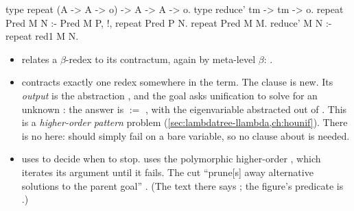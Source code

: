 {{\begin{lprolog}
type repeat   (A -> A -> o) -> A -> A -> o.
type reduce'  tm -> tm -> o.
repeat Pred M N :- Pred M P, !, repeat Pred P N.
repeat Pred M M.
reduce' M N :- repeat red1 M N.
\end{lprolog}
\begin{itemize}[nosep]
  \item {} relates a $\beta$-redex to its contractum, again by meta-level $\beta$: .
  \item {} contracts exactly one redex somewhere in the term. The  clause is new. Its
        \emph{output} is the abstraction , and the goal  asks unification to solve
         for an unknown : the answer is  $:=$ , with the eigenvariable abstracted
        out of . This is a \emph{higher-order pattern} problem (\cref{sec:lambdatree-llambda,ch:hounif}).
        There is no \lp{=>} here:  should simply fail on a bare variable, so no clause about  is
        needed.
  \item {} uses  to decide when to stop.  uses the polymorphic higher-order
        , which iterates its argument until it fails. The cut \lp{!} \enquote{prune[s] away alternative
        solutions to the parent goal} . (The text there says ; the figure's predicate is
        .)
\end{itemize}

}}
